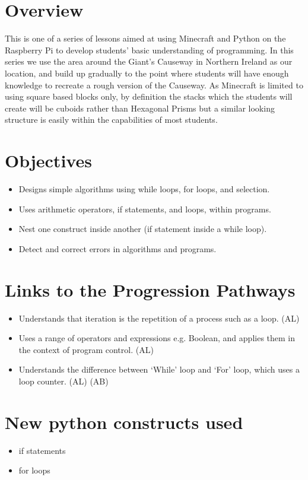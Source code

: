 \documentclass{geocraft-lesson-plan}
\begin{document}
\subtitle{Part 3 - Selection}

\section*{Overview} This is one of a series of lessons aimed at using Minecraft and Python on the Raspberry Pi to
develop students' basic understanding of programming. In this series we use the area around the Giant's Causeway in
Northern Ireland as our location, and build up gradually to the point where students will have enough knowledge to
recreate a rough version of the Causeway. As Minecraft is limited to using square based blocks only, by definition the
stacks which the students will create will be cuboids rather than Hexagonal Prisms but a similar looking structure is
easily within the capabilities of most students.

\section*{Objectives}
\begin{itemize}
\item Designs simple algorithms using while loops, for loops, and selection.
\item Uses arithmetic operators, if statements, and loops, within programs.
\item Nest one construct inside another (if statement inside a while loop).
\item Detect and correct errors in algorithms and programs.
\end{itemize}

\section*{Links to the Progression Pathways}
\begin{itemize}
\item Understands that iteration is the repetition of a process such as a loop. (AL)
\item Uses a range of operators and expressions e.g. Boolean, and applies them in the context of program control. (AL) 
\item Understands the difference between ‘While’ loop and ‘For’ loop, which uses a loop counter. (AL) (AB)
\end{itemize}

\section*{New python constructs used}
\begin{itemize}
\item if statements
\item for loops
\end{itemize}
\end{document}
